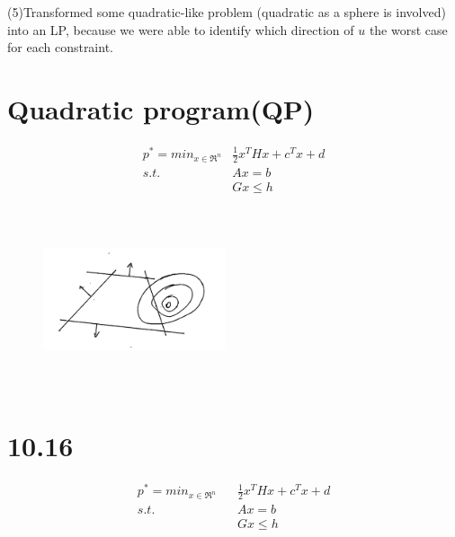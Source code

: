 (5)Transformed some quadratic-like problem (quadratic as a sphere is involved) into an LP, because we were able to identify which direction of $u$ the worst case for each constraint.























\newpage

\section{Quadratic program(QP)}

\begin{align*}
p^* = min_{x\in \Re^n} &\frac{1}{2}x^THx + c^Tx + d\\
s.t. \,\,\, &Ax = b\\
&Gx \leq h
\end{align*}

\begin{figure}
	\centering
	\includegraphics[width=2.1in,height=2.1in]{figures/ch07/figure1016_7.png}
\end{figure}


\section{10.16}


\begin{align*}
p^* = min_{x\in \Re^n}\,\,\,\,\, &\frac{1}{2}x^THx + c^Tx + d\\
 s.t.\,\,\,\,\, &Ax = b\\
 &Gx\leq h
\end{align*}



